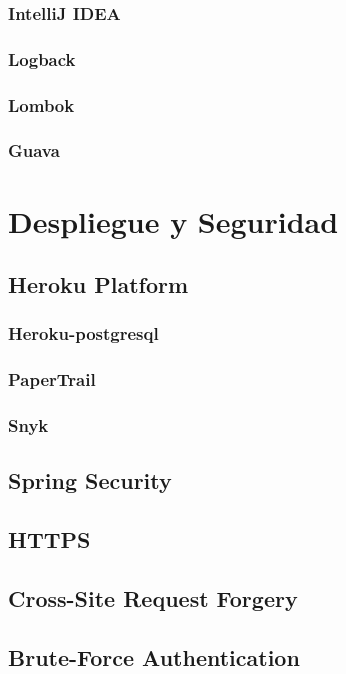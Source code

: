 \documentclass[a4paper]{report}
\begin{document}
    \subsubsection{IntelliJ IDEA}
    \subsubsection{Logback}
    \subsubsection{Lombok}
    \subsubsection{Guava}

    \section{Despliegue y Seguridad}
        \subsection{Heroku Platform}
            \subsubsection{Heroku-postgresql}
            \subsubsection{PaperTrail}
            \subsubsection{Snyk}
        \subsection{Spring Security}
        \subsection{HTTPS}
        \subsection{Cross-Site Request Forgery}
        \subsection{Brute-Force Authentication}
\end{document}
